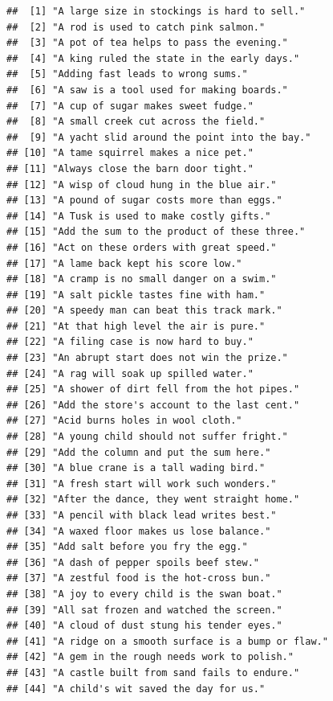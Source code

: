 \documentclass[
]{article}
\begin{document}
\begin{verbatim}
##  [1] "A large size in stockings is hard to sell."      
##  [2] "A rod is used to catch pink salmon."             
##  [3] "A pot of tea helps to pass the evening."         
##  [4] "A king ruled the state in the early days."       
##  [5] "Adding fast leads to wrong sums."                
##  [6] "A saw is a tool used for making boards."         
##  [7] "A cup of sugar makes sweet fudge."               
##  [8] "A small creek cut across the field."             
##  [9] "A yacht slid around the point into the bay."     
## [10] "A tame squirrel makes a nice pet."               
## [11] "Always close the barn door tight."               
## [12] "A wisp of cloud hung in the blue air."           
## [13] "A pound of sugar costs more than eggs."          
## [14] "A Tusk is used to make costly gifts."            
## [15] "Add the sum to the product of these three."      
## [16] "Act on these orders with great speed."           
## [17] "A lame back kept his score low."                 
## [18] "A cramp is no small danger on a swim."           
## [19] "A salt pickle tastes fine with ham."             
## [20] "A speedy man can beat this track mark."          
## [21] "At that high level the air is pure."             
## [22] "A filing case is now hard to buy."               
## [23] "An abrupt start does not win the prize."         
## [24] "A rag will soak up spilled water."               
## [25] "A shower of dirt fell from the hot pipes."       
## [26] "Add the store's account to the last cent."       
## [27] "Acid burns holes in wool cloth."                 
## [28] "A young child should not suffer fright."         
## [29] "Add the column and put the sum here."            
## [30] "A blue crane is a tall wading bird."             
## [31] "A fresh start will work such wonders."           
## [32] "After the dance, they went straight home."       
## [33] "A pencil with black lead writes best."           
## [34] "A waxed floor makes us lose balance."            
## [35] "Add salt before you fry the egg."                
## [36] "A dash of pepper spoils beef stew."              
## [37] "A zestful food is the hot-cross bun."            
## [38] "A joy to every child is the swan boat."          
## [39] "All sat frozen and watched the screen."          
## [40] "A cloud of dust stung his tender eyes."          
## [41] "A ridge on a smooth surface is a bump or flaw."  
## [42] "A gem in the rough needs work to polish."        
## [43] "A castle built from sand fails to endure."       
## [44] "A child's wit saved the day for us."             

\end{verbatim}
\end{document}
